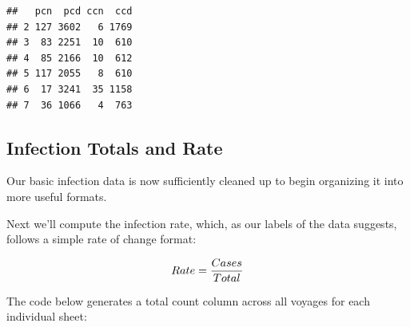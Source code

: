\documentclass[
  11,
]{book}
\newenvironment{Shaded}{\begin{snugshade}}{\end{snugshade}}
\newcommand{\FloatTok}[1]{\textcolor[rgb]{0.06,0.06,0.06}{#1}}
\newcommand{\FunctionTok}[1]{\textcolor[rgb]{0.27,0.27,0.27}{\textbf{#1}}}
\newcommand{\NormalTok}[1]{#1}
\newcommand{\OtherTok}[1]{\textcolor[rgb]{0.37,0.37,0.37}{#1}}
\newcommand{\SpecialCharTok}[1]{\textcolor[rgb]{0.43,0.43,0.43}{\textbf{#1}}}
\newcommand{\StringTok}[1]{\textcolor[rgb]{0.5,0.5,0.5}{#1}}
\begin{document}
\begin{Shaded}
\end{Shaded}

\begin{verbatim}
##   pcn  pcd ccn  ccd
## 2 127 3602   6 1769
## 3  83 2251  10  610
## 4  85 2166  10  612
## 5 117 2055   8  610
## 6  17 3241  35 1158
## 7  36 1066   4  763
\end{verbatim}

\hypertarget{infection-totals-and-rate}{%
\subsection*{Infection Totals and Rate}\label{infection-totals-and-rate}}


Our basic infection data is now sufficiently cleaned up to begin organizing it into more useful formats.

Next we'll compute the infection rate, which, as our labels of the data suggests, follows a simple rate of change format:

\[
Rate = {Cases \over Total}
\]

The code below generates a total count column across all voyages for each individual sheet:
\end{document}
